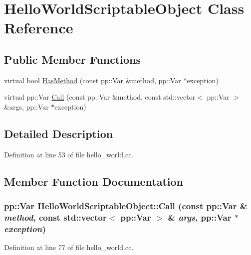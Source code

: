 \hypertarget{class_hello_world_scriptable_object}{
\section{HelloWorldScriptableObject Class Reference}
\label{class_hello_world_scriptable_object}
}
\subsection*{Public Member Functions}
\begin{DoxyCompactItemize}
\item 
virtual bool \hyperlink{class_hello_world_scriptable_object_a0af23165c74483e47f97877cbb51e79a}{HasMethod} (const pp::Var \&method, pp::Var $\ast$exception)
\item 
virtual pp::Var \hyperlink{class_hello_world_scriptable_object_a217b4b958a4bfb250dd8ac588ab794ad}{Call} (const pp::Var \&method, const std::vector$<$ pp::Var $>$ \&args, pp::Var $\ast$exception)
\end{DoxyCompactItemize}


\subsection{Detailed Description}


Definition at line 53 of file hello\_\-world.cc.



\subsection{Member Function Documentation}
\hypertarget{class_hello_world_scriptable_object_a217b4b958a4bfb250dd8ac588ab794ad}{
\subsubsection[{Call}]{\setlength{\rightskip}{0pt plus 5cm}pp::Var HelloWorldScriptableObject::Call (const pp::Var \& {\em method}, \/  const std::vector$<$ pp::Var $>$ \& {\em args}, \/  pp::Var $\ast$ {\em exception})}}
\label{class_hello_world_scriptable_object_a217b4b958a4bfb250dd8ac588ab794ad}


Definition at line 77 of file hello\_\-world.cc.

